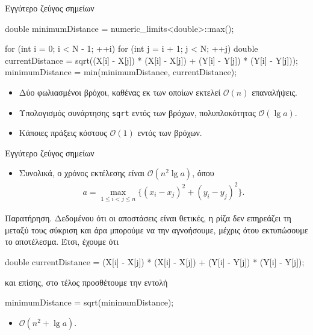 \documentclass[t,aspectratio=169,9pt]{beamer}
\begin{document}
\begin{frame}[fragile]{Εγγύτερο ζεύγος σημείων}
\begin{cpp}
double minimumDistance = numeric_limits<double>::max();

for (int i = 0; i < N - 1; ++i) 
{
    for (int j = i + 1; j < N; ++j)
    {
        double currentDistance = sqrt((X[i] - X[j]) * (X[i] - X[j]) + (Y[i] - Y[j]) * (Y[i] - Y[j]));
        minimumDistance = min(minimumDistance, currentDistance);
    }
}
\end{cpp}
\pause
\vspace{0.25cm}
\begin{itemize}
    \pause
    \item Δύο φωλιασμένοι βρόχοι, καθένας εκ των οποίων εκτελεί $\mathcal{O}(n)$ επαναλήψεις.
    \pause
    \item Υπολογισμός συνάρτησης \texttt{sqrt} εντός των βρόχων, πολυπλοκότητας $\mathcal{O}(\lg a)$. %
    \pause
    \item Κάποιες πράξεις κόστους $\mathcal{O}(1)$ εντός των βρόχων.
\end{itemize}
\end{frame}

\begin{frame}[fragile]{Εγγύτερο ζεύγος σημείων}
    \begin{itemize}
        \item Συνολικά, ο χρόνος εκτέλεσης είναι $\mathcal{O}(n^2 \lg a)$, όπου 
        \begin{align*}
            a = \max_{1 \leq i < j \leq n}\{(x_{i} - x_{j})^{2} + (y_{i} - y_{j})^{2}\}.
        \end{align*}
    \end{itemize}
    \pause
    \begin{block}{Παρατήρηση.} 
        Δεδομένου ότι οι αποστάσεις είναι θετικές, η ρίζα δεν επηρεάζει τη μεταξύ τους
        σύκριση και άρα μπορούμε να την αγνοήσουμε, μέχρις ότου εκτυπώσουμε το αποτέλεσμα. Έτσι, 
        έχουμε ότι
        \begin{cpp}
            double currentDistance = (X[i] - X[j]) * (X[i] - X[j]) + (Y[i] - Y[j]) * (Y[i] - Y[j]);
        \end{cpp}
        και επίσης, στο τέλος προσθέτουμε την εντολή
        \begin{cpp}
            minimumDistance = sqrt(minimumDistance);
        \end{cpp}
    \end{block}
    \pause
    \begin{itemize}
        \pause
        \item $\mathcal{O}(n^2 + \lg a)$.
    \end{itemize}
\end{frame}
\end{document}
